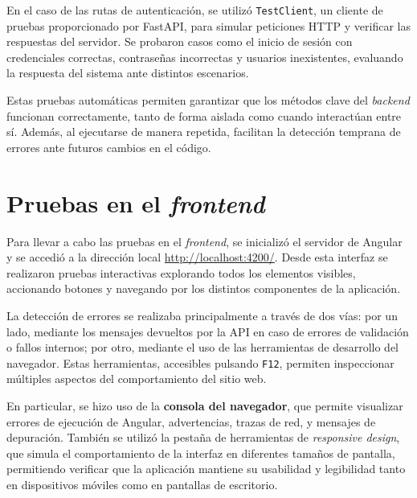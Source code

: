 En el caso de las rutas de autenticación, se utilizó \texttt{TestClient}, un cliente de pruebas proporcionado por FastAPI, para simular peticiones HTTP y verificar las respuestas del servidor. Se probaron casos como el inicio de sesión con credenciales correctas, contraseñas incorrectas y usuarios inexistentes, evaluando la respuesta del sistema ante distintos escenarios.

Estas pruebas automáticas permiten garantizar que los métodos clave del \textit{backend} funcionan correctamente, tanto de forma aislada como cuando interactúan entre sí. Además, al ejecutarse de manera repetida, facilitan la detección temprana de errores ante futuros cambios en el código.

\newpage

\section{Pruebas en el \textit{frontend}}

Para llevar a cabo las pruebas en el \textit{frontend}, se inicializó el servidor de Angular y se accedió a la dirección local \href{http://localhost:4200/}{http://localhost:4200/}. Desde esta interfaz se realizaron pruebas interactivas explorando todos los elementos visibles, accionando botones y navegando por los distintos componentes de la aplicación.

La detección de errores se realizaba principalmente a través de dos vías: por un lado, mediante los mensajes devueltos por la API en caso de errores de validación o fallos internos; por otro, mediante el uso de las herramientas de desarrollo del navegador. Estas herramientas, accesibles pulsando \texttt{F12}, permiten inspeccionar múltiples aspectos del comportamiento del sitio web.

En particular, se hizo uso de la \textbf{consola del navegador}, que permite visualizar errores de ejecución de Angular, advertencias, trazas de red, y mensajes de depuración. También se utilizó la pestaña de herramientas de \textit{responsive design}, que simula el comportamiento de la interfaz en diferentes tamaños de pantalla, permitiendo verificar que la aplicación mantiene su usabilidad y legibilidad tanto en dispositivos móviles como en pantallas de escritorio.


